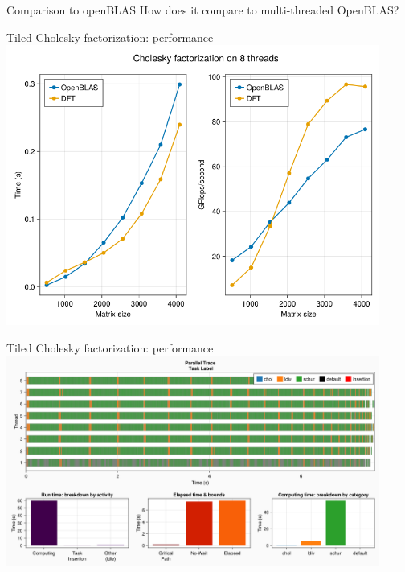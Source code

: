 \documentclass{beamer}
\begin{document}
\begin{frame}{Comparison to openBLAS}
  \center \Large How does it compare to multi-threaded OpenBLAS?
\end{frame}

\begin{frame}{Tiled Cholesky factorization: performance}
  \centering\includegraphics[width=0.92\textwidth]{Cholesky_perf.png}
\end{frame}

\begin{frame}{Tiled Cholesky factorization: performance}
  \centering\includegraphics[width=0.92\textwidth]{traceplot_large.png}
\end{frame}
  

\end{document}
